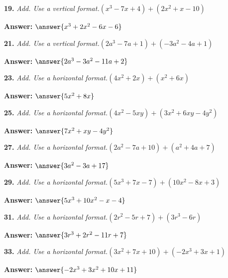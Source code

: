 \documentclass{ximera}
\begin{document}
\begin{problem}
\textbf{19.} \emph{Add. Use a vertical format.}\quad $(x^3 - 7x + 4) + (2x^2 + x - 10)$

\textbf{Answer:} $\answer{x^3 +2x^2 -6x -6}$
\end{problem}

\begin{problem}
\textbf{21.} \emph{Add. Use a vertical format.}\quad $(2a^3 - 7a + 1) + (-3a^2 - 4a + 1)$

\textbf{Answer:} $\answer{2a^3 -3a^2 -11a +2}$
\end{problem}

\begin{problem}
\textbf{23.} \emph{Add. Use a horizontal format.}\quad $(4x^2 + 2x) + (x^2 + 6x)$

\textbf{Answer:} $\answer{5x^2 +8x}$
\end{problem}

\begin{problem}
\textbf{25.} \emph{Add. Use a horizontal format.}\quad $(4x^2 - 5xy) + (3x^2 + 6xy - 4y^2)$

\textbf{Answer:} $\answer{7x^2 +xy -4y^2}$
\end{problem}

\begin{problem}
\textbf{27.} \emph{Add. Use a horizontal format.}\quad $(2a^2 - 7a + 10) + (a^2 + 4a + 7)$

\textbf{Answer:} $\answer{3a^2 -3a +17}$
\end{problem}

\begin{problem}
\textbf{29.} \emph{Add. Use a horizontal format.}\quad $(5x^3 + 7x - 7) + (10x^2 - 8x + 3)$

\textbf{Answer:} $\answer{5x^3 +10x^2 -x -4}$
\end{problem}

\begin{problem}
\textbf{31.} \emph{Add. Use a horizontal format.}\quad $(2r^2 - 5r + 7) + (3r^3 - 6r)$

\textbf{Answer:} $\answer{3r^3 +2r^2 -11r +7}$
\end{problem}

\begin{problem}
\textbf{33.} \emph{Add. Use a horizontal format.}\quad $(3x^2 + 7x + 10) + (-2x^3 + 3x + 1)$

\textbf{Answer:} $\answer{-2x^3 +3x^2 +10x +11}$
\end{problem}
\end{document}
